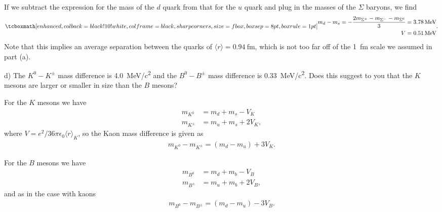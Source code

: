 If we subtract the expression for the mass of the $d$ quark from that for the $u$ quark and plug in the masses of the $\Sigma$ baryons, we find
\begin{eqnarray}
    \label{eq:mass-diff_binding}
    \eqbox{
        \begin{aligned}
            m_{d} - m_{s} = -\frac{2m_{\Sigma^{+}} - m_{\Sigma^{-}} - m_{\Sigma^{0}}}{3} &= \SI{3.78}{\MeV} \\
            V &= \SI{0.51}{\MeV}
        \end{aligned}
}
.\end{eqnarray}
Note that this implies an average separation between the quarks of $\langle r \rangle = \SI{0.94}{\femto\m}$, which is not too far off of the \SI{1}{\femto\m} scale we assumed in part (a).


d) The $K^{0} - K^{\pm}$ mass difference is \SI{4.0}{\MeV / c^2} and the $B^{0} - B^{\pm}$ mass difference is \SI{0.33}{\MeV / c^2}.
Does this suggest to you that the $K$ mesons are larger or smaller in size than the $B$ mesons?

For the $K$ mesons we have
\begin{align}
    \label{eq:K-mass}
    m_{K^{0}} &= m_{d} + m_{s} - V_{K} \\
    m_{K^{\pm}} &= m_{u} + m_{s} + 2V_{K}
,\end{align}
where $V=e^2/36\pi\epsilon_0\langle r \rangle_{K}$, so the Kaon mass difference is given as
\begin{eqnarray}
    \label{eq:K-mass-diff}
    m_{K^{0}} - m_{K^{\pm}} = (m_{d} - m_{u}) + 3V_{K}
.\end{eqnarray}

For the $B$ mesons we have
\begin{align}
    \label{eq:B-mass} 
    m_{B^{0}} &= m_{d} + m_{b} - V_{B} \\
    m_{B^{\pm}} &= m_{u} + m_{b} + 2V_{B}
,\end{align}
and as in the case with kaons
\begin{eqnarray}
    \label{eq:B-mass-diff}
    m_{B^{0}} - m_{B^{\pm}} = (m_{d} - m_{u}) - 3V_{B}
.\end{eqnarray}



